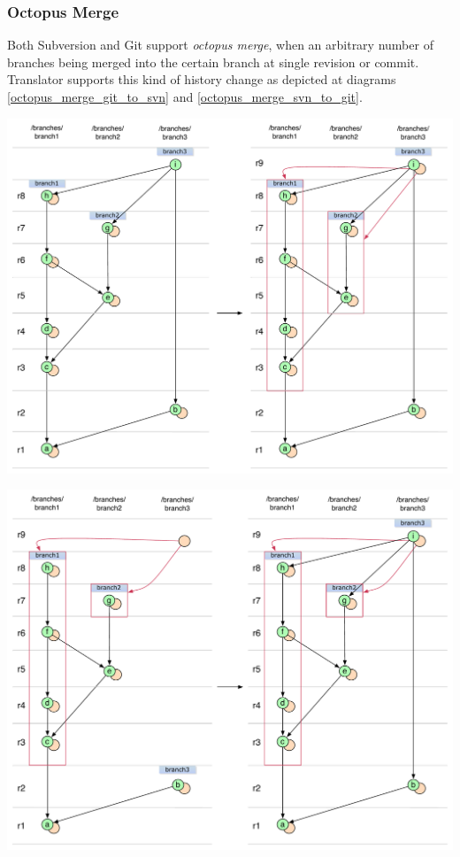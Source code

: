 \subsubsection{Octopus Merge}

Both Subversion and Git support \emph{octopus merge}, when an arbitrary number of branches being merged into the certain branch at single revision or commit. Translator supports this kind of history change as depicted at diagrams \ref{octopus_merge_git_to_svn} and \ref{octopus_merge_svn_to_git}.

\begin{center}
\includegraphics[width=\textwidth]{img/diagrams/octopus_merge_git_to_svn.pdf}%
\label{octopus_merge_git_to_svn}%
\end{center}

\begin{center}
\includegraphics[width=\textwidth]{img/diagrams/octopus_merge_svn_to_git.pdf}%
\label{octopus_merge_svn_to_git}%
\end{center}
